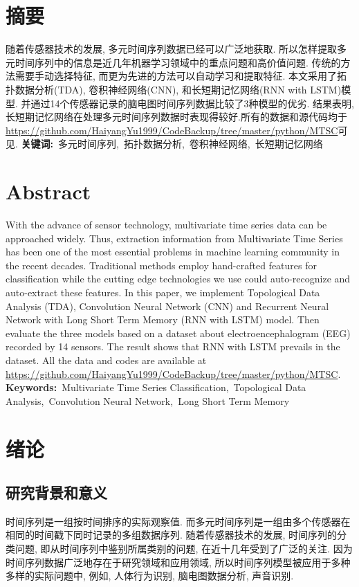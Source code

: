 \documentclass[12pt]{ctexart}
\begin{document}

\thispagestyle{plain}
\section*{摘要}
随着传感器技术的发展, 多元时间序列数据已经可以广泛地获取. 所以怎样提取多元时间序列中的信息是近几年机器学习领域中的重点问题和高价值问题. 传统的方法需要手动选择特征, 而更为先进的方法可以自动学习和提取特征. 本文采用了拓扑数据分析(TDA), 卷积神经网络(CNN), 和长短期记忆网络(RNN with LSTM)模型. 并通过14个传感器记录的脑电图时间序列数据比较了3种模型的优劣. 结果表明, 长短期记忆网络在处理多元时间序列数据时表现得较好.所有的数据和源代码均于\url{https://github.com/HaiyangYu1999/CodeBackup/tree/master/python/MTSC}可见.
\newline
\newline
\textbf{关键词:}\ 多元时间序列,\ 拓扑数据分析,\ 卷积神经网络,\ 长短期记忆网络
\section*{Abstract}
\noindent With the advance of sensor technology, multivariate time series data can be approached widely. Thus, extraction information from Multivariate Time Series has been one of the most essential problems in machine learning community in the recent decades. Traditional methods employ hand-crafted features for classification while the cutting edge technologies we use could auto-recognize and auto-extract these features. In this paper, we implement Topological Data Analysis (TDA), Convolution Neural Network (CNN) and Recurrent Neural Network with Long Short Term Memory (RNN with LSTM) model. Then evaluate the three models based on a dataset about electroencephalogram (EEG) recorded by 14 sensors. The result shows that RNN with LSTM prevails in the dataset. All the data and codes are available at \url{https://github.com/HaiyangYu1999/CodeBackup/tree/master/python/MTSC}.
\newline
\newline
\textbf{Keywords:}\ Multivariate Time Series Classification,\ Topological Data Analysis,\ Convolution Neural Network,\ Long Short Term Memory

\newpage
\thispagestyle{plain}
\setcounter{page}{1}
\tableofcontents
\newpage
{}
\setcounter{page}{1}
\section{绪论}
\subsection{研究背景和意义}
时间序列是一组按时间排序的实际观察值. 而多元时间序列是一组由多个传感器在相同的时间戳下同时记录的多组数据序列. 随着传感器技术的发展, 时间序列的分类问题, 即从时间序列中鉴别所属类别的问题, 在近十几年受到了广泛的关注. 因为时间序列数据广泛地存在于研究领域和应用领域, 所以时间序列模型被应用于多种多样的实际问题中, 例如, 人体行为识别\cite{ref1}, 脑电图数据分析\cite{ref2}, 声音识别\cite{ref3}. 
\end{document}
